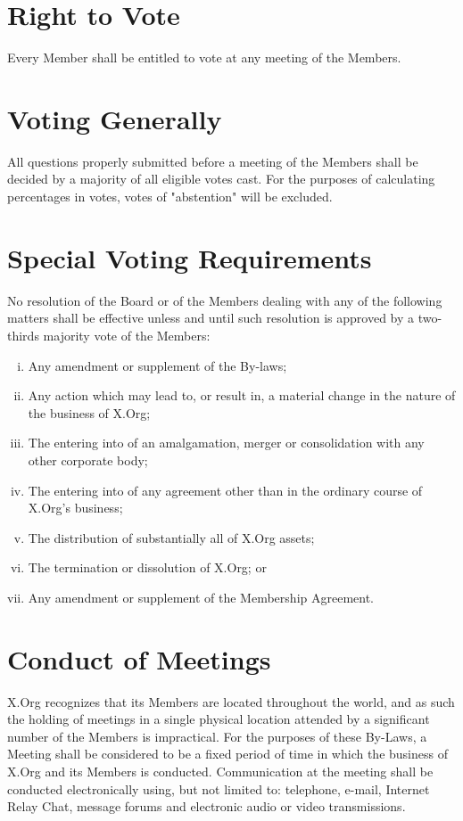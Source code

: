 \documentclass[10pt, english]{xorgdocs}
\begin{document}
\section{Right to Vote}
Every Member shall be entitled to vote at any meeting of the Members.

\section{Voting Generally}
All questions properly submitted before a meeting of the Members shall be decided
by a majority of all eligible votes cast.  For the purposes of calculating
percentages in votes, votes of "abstention" will be excluded.

\section{Special Voting Requirements}
\label{section_voting_requirements}

No resolution of the Board or of the Members dealing with any of the following
matters shall be effective unless and until such resolution is approved by a
two-thirds majority vote of the Members:

\begin{enumerate}[(i)\hspace{.2cm}]
	\item Any amendment or supplement of the By-laws;

	\item Any action which may lead to, or result in, a material change
	in the nature of the business of X.Org;

	\item The entering into of an amalgamation, merger or consolidation with
	any other corporate body;

	\item The entering into of any agreement other than in the ordinary
	course of X.Org's business;

	\item The distribution of substantially all of X.Org assets;

	\item The termination or dissolution of X.Org; or

	\item Any amendment or supplement of the Membership Agreement.
\end{enumerate}

\section{Conduct of Meetings}
X.Org recognizes that its Members are located throughout the world, and as such
the holding of meetings in a single physical location attended by a significant
number of the Members is impractical. For the purposes of these By-Laws, a
Meeting shall be considered to be a fixed period of time in which the business
of X.Org and its Members is conducted. Communication at the meeting shall be
conducted electronically using, but not limited to: telephone, e-mail, Internet
Relay Chat, message forums and electronic audio or video transmissions.
\end{document}
